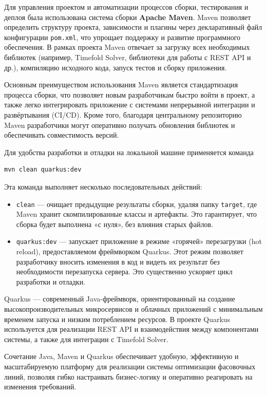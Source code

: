 Для управления проектом и автоматизации процессов сборки, тестирования и деплоя была использована система сборки \textbf{Apache Maven}. Maven позволяет определить структуру проекта, зависимости и плагины через декларативный файл конфигурации \texttt{pom.xml}, что упрощает поддержку и развитие программного обеспечения. В рамках проекта Maven отвечает за загрузку всех необходимых библиотек (например, Timefold Solver, библиотеки для работы с REST API и др.), компиляцию исходного кода, запуск тестов и сборку приложения.

Основным преимуществом использования Maven является стандартизация процесса сборки, что позволяет новым разработчикам быстро войти в проект, а также легко интегрировать приложение с системами непрерывной интеграции и развёртывания (CI/CD). Кроме того, благодаря центральному репозиторию Maven разработчики могут оперативно получать обновления библиотек и обеспечивать совместимость версий.

Для удобства разработки и отладки на локальной машине применяется команда

\begin{verbatim}
mvn clean quarkus:dev
\end{verbatim}

Эта команда выполняет несколько последовательных действий:

\begin{itemize}
    \item \texttt{clean} — очищает предыдущие результаты сборки, удаляя папку \texttt{target}, где Maven хранит скомпилированные классы и артефакты. Это гарантирует, что сборка будет выполнена «с нуля», без влияния старых файлов.
    \item \texttt{quarkus:dev} — запускает приложение в режиме «горячей» перезагрузки (hot reload), предоставляемом фреймворком Quarkus. Этот режим позволяет разработчику вносить изменения в код и видеть их результат без необходимости перезапуска сервера. Это существенно ускоряет цикл разработки и отладки.
\end{itemize}

Quarkus — современный Java-фреймворк, ориентированный на создание высокопроизводительных микросервисов и облачных приложений с минимальным временем запуска и низким потреблением ресурсов. В проекте Quarkus используется для реализации REST API и взаимодействия между компонентами системы, а также для интеграции с Timefold Solver. \cite{quarkus2025docs}

Сочетание Java, Maven и Quarkus обеспечивает удобную, эффективную и масштабируемую платформу для реализации системы оптимизации фасовочных линий, позволяя гибко настраивать бизнес-логику и оперативно реагировать на изменения требований.

